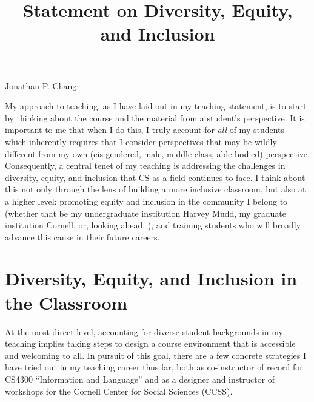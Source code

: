 \documentclass[12pt,letterpaper]{article}
\title{Statement on Diversity, Equity, and Inclusion}
\begin{document}
\maketitle

{\centering Jonathan P. Chang \par}

\vspace{0.5\baselineskip}

My approach to teaching, as I have laid out in my teaching statement, is to start by thinking about the course and the material from a student's perspective.
It is important to me that when I do this, I truly account for \emph{all} of my students---which inherently requires that I consider perspectives that may be wildly different from my own (cis-gendered, male, middle-class, able-bodied) perspective.
Consequently, a central tenet of my teaching is addressing the challenges in diversity, equity, and inclusion that CS as a field continues to face.
I think about this not only through the lens of building a more inclusive classroom, but also at a higher level: promoting equity and inclusion in the community I belong to (whether that be my undergraduate institution Harvey Mudd, my graduate institution Cornell, or, looking ahead, \schoolname), and training students who will broadly advance this cause in their future careers.

\section{Diversity, Equity, and Inclusion in the Classroom}
At the most direct level, accounting for diverse student backgrounds in my teaching implies taking steps to design a course environment that is accessible and welcoming to all.
In pursuit of this goal, there are a few concrete strategies I have tried out in my teaching career thus far, both as co-instructor of record for CS4300 ``Information and Language'' and as a designer and instructor of workshops for the Cornell Center for Social Sciences (CCSS).
\end{document}
